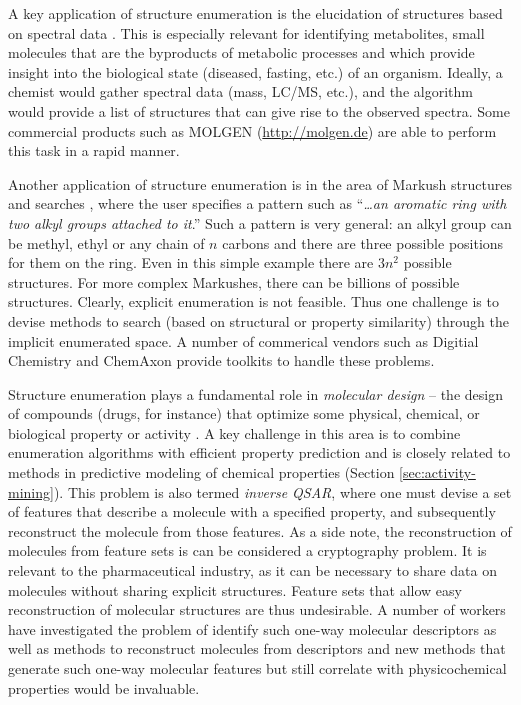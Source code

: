 \documentclass{sig-alternate}
\begin{document}
A key application of structure enumeration is the elucidation of
structures based on spectral data \cite{Kind:2010zr}. This is
especially relevant for identifying metabolites, small molecules
that are the byproducts of metabolic processes and which provide
insight into the biological state (diseased, fasting, etc.) of an
organism. Ideally, a chemist would gather spectral data (mass, LC/MS, etc.),
and the algorithm would provide a list of structures that can give
rise to the observed spectra. Some commercial products such as MOLGEN
(\url{http://molgen.de}) are able to perform this task in a rapid
manner.

Another application of structure enumeration is in the area of Markush
structures and searches \cite{Barnard:1991vn}, where the user
specifies a pattern such as ``\emph{\ldots an aromatic ring with two
  alkyl groups attached to it}.'' Such a pattern is very general: an
alkyl group can be methyl, ethyl or any chain of $n$ carbons and there
are three possible positions for them on the ring. Even in this simple
example there are $3n^2$ possible structures. For more complex
Markushes, there can be billions of possible structures. Clearly,
explicit enumeration is not feasible. Thus one challenge is to devise
methods to search (based on structural or property similarity) through
the implicit enumerated space. A number of commerical vendors such as
Digitial Chemistry and ChemAxon provide toolkits to handle these
problems.

Structure enumeration plays a fundamental role in \emph{molecular
  design} -- the design of compounds (drugs, for instance) that
optimize some physical, chemical, or biological property or activity
\cite{Schneider:2005uq}. A key challenge in this area is to combine
enumeration algorithms with efficient property prediction and is
closely related to methods in predictive modeling of chemical
properties (Section \ref{sec:activity-mining}). This problem is also
termed \emph{inverse QSAR}, where one must devise a set of features
that describe a molecule with a specified property, and subsequently
reconstruct the molecule from those features. As a side note, the
reconstruction of molecules from feature sets is can be considered a
cryptography problem. It is relevant to the pharmaceutical industry,
as it can be necessary to share data on molecules without sharing
explicit structures. Feature sets that allow easy reconstruction of
molecular structures are thus undesirable. A number of workers have
investigated the problem of identify such one-way molecular
descriptors as well as methods to reconstruct molecules from
descriptors \cite{Masek:2008kx} and new methods that generate such
one-way molecular features but still correlate with physicochemical
properties would be invaluable.
\end{document}
